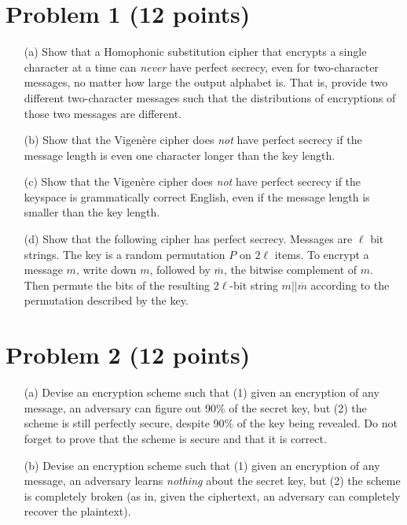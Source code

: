 





\section{Problem 1 (12 points)}

\begin{itemize}
	\item[(a)] Show that a Homophonic substitution cipher that encrypts a single character at a time can \emph{never} have perfect secrecy, even for two-character messages, no matter how large the output alphabet is.  That is, provide two different two-character messages such that the distributions of encryptions of those two messages are different.  
	\item[(b)] Show that the Vigen\`ere cipher does \emph{not} have perfect secrecy if the message length is even one character longer than the key length. 
	\item[(c)] Show that the Vigen\`ere cipher does \emph{not} have perfect secrecy if the keyspace is grammatically correct English, even if the message length is smaller than the key length.
	\item[(d)] Show that the following cipher has perfect secrecy.  Messages are $\ell$ bit strings.  The key is a random permutation $P$ on $2\ell$ items.  To encrypt a message $m$, write down $m$, followed by $\overline{m}$, the bitwise complement of $m$.  Then permute the bits of the resulting $2\ell$-bit string $m||\overline{m}$ according to the permutation described by the key.
\end{itemize}



\section{Problem 2 (12 points)}

\begin{itemize}
	\item[(a)] Devise an encryption scheme such that (1) given an encryption of any message, an adversary can figure out 90\% of the secret key, but (2) the scheme is still perfectly secure, despite 90\% of the key being revealed.  Do not forget to prove that the scheme is secure and that it is correct.
	\item[(b)] Devise an encryption scheme such that (1) given an encryption of any message, an adversary learns \emph{nothing} about the secret key, but (2) the scheme is completely broken (as in, given the ciphertext, an adversary can completely recover the plaintext).
\end{itemize}


